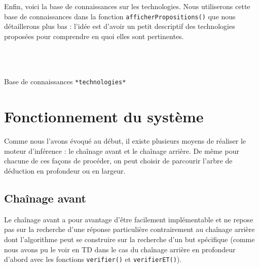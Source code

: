 \documentclass[a4paper,12pt]{article}
\begin{document}
 Enfin, voici la base de connaissances sur les technologies. Nous utiliserons cette base de connaissances dans la fonction \texttt{afficherPropositions()} que nous détaillerons plus bas : l'idée est d'avoir un petit descriptif des technologies proposées pour comprendre en quoi elles sont pertinentes.

\begin{listing}[H]
	\centering
	\inputminted[breaklines=true,linenos,lastline=28]{lisp}{../technologies.lisp}
\end{listing}

\begin{listing}[H]
	\centering
	\inputminted[breaklines=true,linenos,firstline=29,lastline=50]{lisp}{../technologies.lisp}
\end{listing}

\begin{listing}[H]
	\centering
	\inputminted[breaklines=true,linenos,firstline=51,lastline=77]{lisp}{../technologies.lisp}
\end{listing}

\begin{listing}[H]
	\centering
	\inputminted[breaklines=true,linenos,firstline=78]{lisp}{../technologies.lisp}
	\caption{Base de connaissances \texttt{*technologies*}}
\end{listing}

\newpage
\section{Fonctionnement du système}

Comme nous l'avons évoqué au début, il existe plusieurs moyens de réaliser le moteur d'inférence : le chaînage avant et le chaînage arrière. De même pour chacune de ces façons de procéder, on peut choisir de parcourir l'arbre de déduction en profondeur ou en largeur.

\subsection{Chaînage avant}

Le chaînage avant a pour avantage d'être facilement implémentable et ne repose pas sur la recherche d'une réponse particulière contrairement au chaînage arrière dont l'algorithme peut se construire sur la recherche d'un but spécifique (comme nous avons pu le voir en TD dans le cas du chaînage arrière en profondeur d'abord avec les fonctions \texttt{verifier()} et \texttt{verifierET()}).
\end{document}
